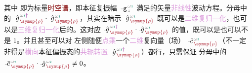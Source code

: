 其中  即为标量\textcolor{Maroon}{时空谱}，即\textcolor{PineGreen}{本征复振幅} $\Xint{\begin{smallmatrix} ~ \\ {}^{}_{\mathcolor{gray}{-}} \\ ~ \end{smallmatrix}}{09}{\mathtt{g}}^{\;\!\mathcolor{gray}{\omega} \textcolor{PineGreen}{\imath}}_{\;\! \mathcolor{gray}{z}}$ 满足的矢量\textcolor{Plum}{非线性}波动方程。分母中的 $\Xint{{}^{}_{\mathcolor{gray}{-}}}{10}{\hat{g}}^{\;\!\mathcolor{gray}{\omega} \textcolor{PineGreen}{\imath} \textcolor{Plum}{\dag}}_{\;\! \textcolor{Maroon}{\symup{\rho}}} \cdot \Xint{{}^{}_{\mathcolor{gray}{-}}}{10}{\hat{g}}^{\;\!\mathcolor{gray}{\omega} \textcolor{PineGreen}{\imath}}_{\;\! \textcolor{Maroon}{\symup{\rho}}}$，其实在暗示 $\Xint{{}^{}_{\mathcolor{gray}{-}}}{10}{\hat{g}}^{\;\!\mathcolor{gray}{\omega} \textcolor{PineGreen}{\imath}}_{\;\! \textcolor{Maroon}{\symup{\rho}}}$ 既可以是\textcolor{Plum}{二维复归一化}，也可以是\textcolor{Plum}{三维复归一化}后的。这对应 $\Xint{{}^{}_{\mathcolor{gray}{-}}}{10}{\hat{g}}^{\;\!\mathcolor{gray}{\omega} \textcolor{PineGreen}{\imath} \textcolor{Plum}{\dag}}_{\;\! \textcolor{Maroon}{\symup{\rho}}} \cdot \Xint{{}^{}_{\mathcolor{gray}{-}}}{10}{\hat{g}}^{\;\!\mathcolor{gray}{\omega} \textcolor{PineGreen}{\imath}}_{\;\! \textcolor{Maroon}{\symup{\rho}}}$ 的值，既可以是也可以不是 $1$。并且甚至可以对  左侧随便\textcolor{Plum}{点乘}一个\textcolor{Plum}{二维}复向量（场） $\Xint{{}^{}_{\mathcolor{gray}{-}}}{04}{\bar{c}}^{\;\!\mathcolor{gray}{\omega} \textcolor{PineGreen}{\imath}}_{\;\! \textcolor{Maroon}{\symup{\rho}}}$（不一定非得是\textcolor{Plum}{横向}\textcolor{PineGreen}{本征偏振态}的\textcolor{Plum}{共轭转置} $\Xint{{}^{}_{\mathcolor{gray}{-}}}{10}{\hat{g}}^{\;\!\mathcolor{gray}{\omega} \textcolor{PineGreen}{\imath} \textcolor{Plum}{\dag}}_{\;\! \textcolor{Maroon}{\symup{\rho}}}$）都行，只需保证  分母中的 $\Xint{{}^{}_{\mathcolor{gray}{-}}}{04}{\bar{c}}^{\;\!\mathcolor{gray}{\omega} \textcolor{PineGreen}{\imath}}_{\;\! \textcolor{Maroon}{\symup{\rho}}} \cdot \Xint{{}^{}_{\mathcolor{gray}{-}}}{10}{\hat{g}}^{\;\!\mathcolor{gray}{\omega} \textcolor{PineGreen}{\imath}}_{\;\! \textcolor{Maroon}{\symup{\rho}}} \neq 0$。

